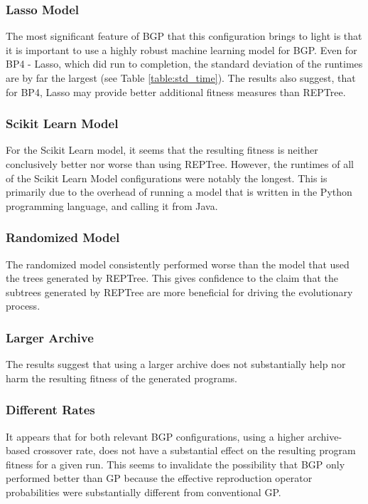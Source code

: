 \subsubsection{Lasso Model}
The most significant feature of BGP that this configuration brings to light is that it is important to use a highly robust machine learning model for BGP.  Even for BP4 - Lasso, which did run to completion, the standard deviation of the runtimes are by far the largest (see Table \ref{table:std_time}).  The results also suggest, that for BP4, Lasso may provide better additional fitness measures than REPTree.

\subsubsection{Scikit Learn Model}
For the Scikit Learn model, it seems that the resulting fitness is neither conclusively better nor worse than using REPTree.  However, the runtimes of all of the Scikit Learn Model configurations were notably the longest.  This is primarily due to the overhead of running a model that is written in the Python programming language, and calling it from Java.

\subsubsection{Randomized Model}
The randomized model consistently performed worse than the model that used the trees generated by REPTree.  This gives confidence to the claim that the subtrees generated by REPTree are more beneficial for driving the evolutionary process. 

\subsubsection{Larger Archive}
The results suggest that using a larger archive does not substantially help nor harm the resulting fitness of the generated programs.

\subsubsection{Different Rates}
It appears that for both relevant BGP configurations, using a higher archive-based crossover rate, does not have a substantial effect on the resulting program fitness for a given run.  This seems to invalidate the possibility that BGP only performed better than GP because the effective reproduction operator probabilities were substantially different from conventional GP.



